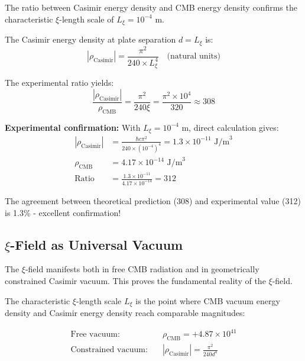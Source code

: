 \documentclass[12pt,a4paper]{article}
\begin{document}
	\begin{experiment}
		The ratio between Casimir energy density and CMB energy density confirms the characteristic $\xi$-length scale of $L_\xi = 10^{-4}$ m.
	\end{experiment}
	
	The Casimir energy density at plate separation $d = L_\xi$ is:
	\begin{equation}
		|\rho_{\text{Casimir}}| = \frac{\pi^2}{240 \times L_\xi^4} \quad \text{(natural units)}
	\end{equation}
	
	The experimental ratio yields:
	\begin{equation}
		\frac{|\rho_{\text{Casimir}}|}{\rho_{\text{CMB}}} = \frac{\pi^2}{240 \xi} = \frac{\pi^2 \times 10^4}{320} \approx 308
	\end{equation}
	
	\textbf{Experimental confirmation:}
	With $L_\xi = 10^{-4}$ m, direct calculation gives:
	\begin{align}
		|\rho_{\text{Casimir}}| &= \frac{\hbar c \pi^2}{240 \times (10^{-4})^4} = 1.3 \times 10^{-11} \text{ J/m}^3 \\
		\rho_{\text{CMB}} &= 4.17 \times 10^{-14} \text{ J/m}^3 \\
		\text{Ratio} &= \frac{1.3 \times 10^{-11}}{4.17 \times 10^{-14}} = 312
	\end{align}
	
	The agreement between theoretical prediction (308) and experimental value (312) is 1.3\% - excellent confirmation!
	
	\subsection{$\xi$-Field as Universal Vacuum}
	
	\begin{important}
		The $\xi$-field manifests both in free CMB radiation and in geometrically constrained Casimir vacuum. This proves the fundamental reality of the $\xi$-field.
	\end{important}
	
	The characteristic $\xi$-length scale $L_\xi$ is the point where CMB vacuum energy density and Casimir energy density reach comparable magnitudes:
	
	\begin{align}
		\text{Free vacuum:} \quad &\rho_{\text{CMB}} = +4.87 \times 10^{41} \\
		\text{Constrained vacuum:} \quad &|\rho_{\text{Casimir}}| = \frac{\pi^2}{240 d^4}
	\end{align}
	
\end{document}
